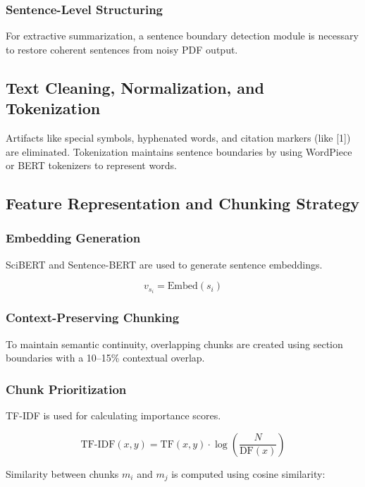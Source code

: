 \documentclass[conference]{IEEEtran}
\begin{document}
\subsubsection{Sentence-Level Structuring}
For extractive summarization, a sentence boundary detection module is necessary to restore coherent sentences from noisy PDF output.

\subsection{Text Cleaning, Normalization, and Tokenization}

Artifacts like special symbols, hyphenated words, and citation markers (like [1]) are eliminated. Tokenization maintains sentence boundaries by using WordPiece or BERT tokenizers to represent words.

\subsection{Feature Representation and Chunking Strategy}

\subsubsection{Embedding Generation}
SciBERT and Sentence-BERT are used to generate sentence embeddings.

\begin{equation}
    v_{s_i} = \text{Embed}(s_i)
\end{equation}

\subsubsection{Context-Preserving Chunking}
To maintain semantic continuity, overlapping chunks are created using section boundaries with a 10--15\% contextual overlap.

\subsubsection{Chunk Prioritization}
TF-IDF is used for calculating importance scores.

\begin{equation}
    \text{TF-IDF}(x,y) = \text{TF}(x,y) \cdot \log\left( \frac{N}{\text{DF}(x)} \right)
\end{equation}

Similarity between chunks $m_i$ and $m_j$ is computed using cosine similarity:
\end{document}

